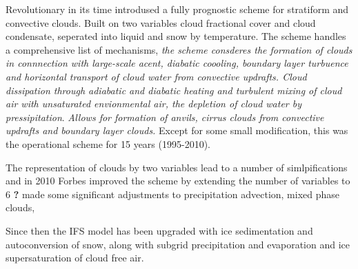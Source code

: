 Revolutionary in its time  introdused a fully prognostic scheme for stratiform and convective clouds. Built on two variables cloud fractional cover and cloud condensate, seperated into liquid and snow by temperature. The scheme handles a comprehensive list of mechanisms, \textit{the scheme consderes the formation of clouds in connnection with large-scale acent, diabatic coooling, boundary layer turbuence and horizontal transport of cloud water from convective updrafts. Cloud dissipation through adiabatic and diabatic heating and turbulent mixing of cloud air with unsaturated envionmental air, the depletion of cloud water by pressipitation}. \textit{Allows for formation of anvils, cirrus clouds from convective updrafts and boundary layer clouds.} 
Except for some small modification, this was the operational scheme for 15 years (1995-2010). 

The representation of clouds by two variables lead to a number of simlpifications and in 2010 Forbes improved the scheme by extending the number of variables to 6 \textbf{?}
  made some significant adjustments to precipitation advection, mixed phase clouds, 

Since then the IFS model has been upgraded with ice sedimentation and autoconversion of snow, along with subgrid precipitation and evaporation and ice supersaturation of cloud free air. 

